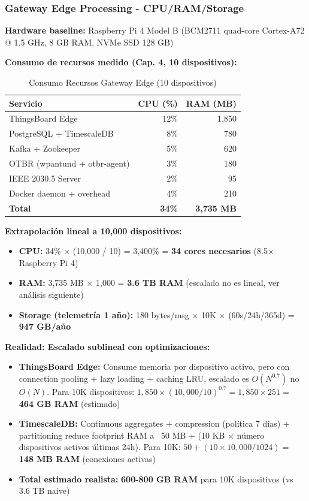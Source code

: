 \subsubsection{Gateway Edge Processing - CPU/RAM/Storage}

\textbf{Hardware baseline:} Raspberry Pi 4 Model B (BCM2711 quad-core Cortex-A72 @ 1.5 GHz, 8 GB RAM, NVMe SSD 128 GB)

\textbf{Consumo de recursos medido (Cap. 4, 10 dispositivos):}

\begin{table}[h]
\centering
\caption{Consumo Recursos Gateway Edge (10 dispositivos)}
\label{tab:gateway-resources-10}
\begin{tabular}{|l|r|r|}
\hline
\textbf{Servicio} & \textbf{CPU (\%)} & \textbf{RAM (MB)} \\
\hline
ThingsBoard Edge & 12\% & 1,850 \\
\hline
PostgreSQL + TimescaleDB & 8\% & 780 \\
\hline
Kafka + Zookeeper & 5\% & 620 \\
\hline
OTBR (wpantund + otbr-agent) & 3\% & 180 \\
\hline
IEEE 2030.5 Server & 2\% & 95 \\
\hline
Docker daemon + overhead & 4\% & 210 \\
\hline
\textbf{Total} & \textbf{34\%} & \textbf{3,735 MB} \\
\hline
\end{tabular}
\end{table}

\textbf{Extrapolación lineal a 10,000 dispositivos:}

\begin{itemize}
\item \textbf{CPU:} 34\% $\times$ (10,000 / 10) = 3,400\% = \textbf{34 cores necesarios} (8.5$\times$ Raspberry Pi 4)
\item \textbf{RAM:} 3,735 MB $\times$ 1,000 = \textbf{3.6 TB RAM} (escalado no es lineal, ver análisis siguiente)
\item \textbf{Storage (telemetría 1 año):} 180 bytes/msg $\times$ 10K $\times$ (60s/24h/365d) = \textbf{947 GB/año}
\end{itemize}

\textbf{Realidad: Escalado sublineal con optimizaciones:}

\begin{itemize}
\item \textbf{ThingsBoard Edge:} Consume memoria por dispositivo activo, pero con connection pooling + lazy loading + caching LRU, escalado es $O(N^{0.7})$ no $O(N)$. Para 10K dispositivos: $1,850 \times (10,000/10)^{0.7} = 1,850 \times 251 =$ \textbf{464 GB RAM} (estimado)
\item \textbf{TimescaleDB:} Continuous aggregates + compression (política 7 días) + partitioning reduce footprint RAM a ~50 MB + (10 KB $\times$ número dispositivos activos últimas 24h). Para 10K: $50 + (10 \times 10,000/1024) =$ \textbf{148 MB RAM} (conexiones activas)
\item \textbf{Total estimado realista:} \textbf{600-800 GB RAM} para 10K dispositivos (vs 3.6 TB naive)
\end{itemize}

